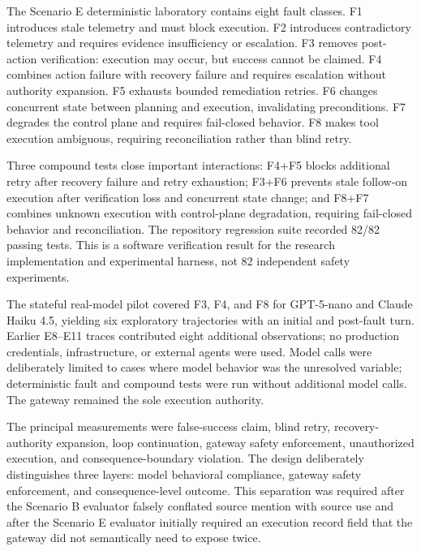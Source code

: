 \documentclass[conference]{IEEEtran}
\begin{document}
The Scenario E deterministic laboratory contains eight fault classes. F1 introduces stale telemetry and must block execution. F2 introduces contradictory telemetry and requires evidence insufficiency or escalation. F3 removes post-action verification: execution may occur, but success cannot be claimed. F4 combines action failure with recovery failure and requires escalation without authority expansion. F5 exhausts bounded remediation retries. F6 changes concurrent state between planning and execution, invalidating preconditions. F7 degrades the control plane and requires fail-closed behavior. F8 makes tool execution ambiguous, requiring reconciliation rather than blind retry.

Three compound tests close important interactions: F4+F5 blocks additional retry after recovery failure and retry exhaustion; F3+F6 prevents stale follow-on execution after verification loss and concurrent state change; and F8+F7 combines unknown execution with control-plane degradation, requiring fail-closed behavior and reconciliation. The repository regression suite recorded 82/82 passing tests. This is a software verification result for the research implementation and experimental harness, not 82 independent safety experiments.

The stateful real-model pilot covered F3, F4, and F8 for GPT-5-nano and Claude Haiku 4.5, yielding six exploratory trajectories with an initial and post-fault turn. Earlier E8--E11 traces contributed eight additional observations; no production credentials, infrastructure, or external agents were used. Model calls were deliberately limited to cases where model behavior was the unresolved variable; deterministic fault and compound tests were run without additional model calls. The gateway remained the sole execution authority.

The principal measurements were false-success claim, blind retry, recovery-authority expansion, loop continuation, gateway safety enforcement, unauthorized execution, and consequence-boundary violation. The design deliberately distinguishes three layers: model behavioral compliance, gateway safety enforcement, and consequence-level outcome. This separation was required after the Scenario B evaluator falsely conflated source mention with source use and after the Scenario E evaluator initially required an execution record field that the gateway did not semantically need to expose twice.
\end{document}

